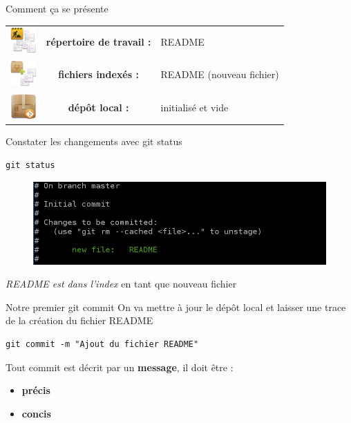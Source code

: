 \documentclass{beamer}
\begin{document}
\begin{frame}{Comment ça se présente}
\begin{center}
	\begin{tabular}{l c l}
	\includegraphics[width=1cm]{img/working_dir} & \textbf{répertoire de travail :} & README \\
	\includegraphics[width=1cm]{img/stash} & \textbf{fichiers indexés :} & README (nouveau fichier)\\
	\includegraphics[width=1cm]{img/git_repo} & \textbf{dépôt local :} & initialisé et vide \\ 
	\end{tabular} 
\end{center}
\end{frame}

\begin{frame}[fragile]{Constater les changements avec git status}
	\begin{lstlisting}[frame=single]
		git status
	\end{lstlisting}
	\begin{figure}
		\centering
		\includegraphics[width=11.5cm]{img/shot2}
	\end{figure}
	\begin{center}
	\textit{README est dans l'index} en tant que nouveau fichier
	\end{center}
\end{frame}

\begin{frame}[fragile]{Notre premier git commit}
	On va mettre à jour le dépôt local et laisser une trace de la création du fichier README
	\begin{lstlisting}[frame=single]
		git commit -m "Ajout du fichier README"
	\end{lstlisting}
	
	Tout commit est décrit par un \textbf{message}, il doit être :
		\begin{itemize}
		\item \textbf{précis}
		\item \textbf{concis}
		\end{itemize}	
\end{frame}
\end{document}
